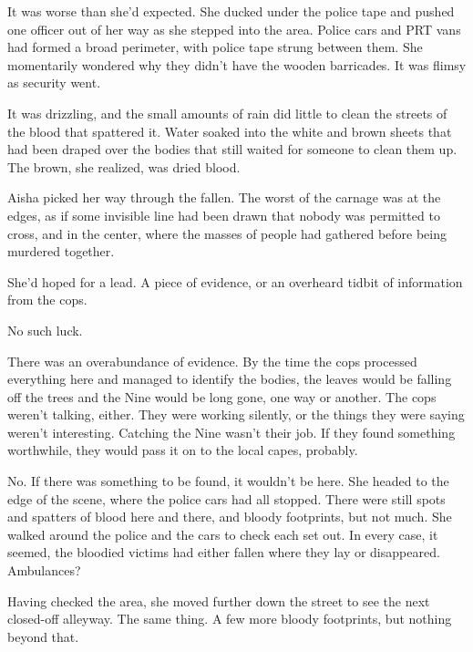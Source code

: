 \sectionbreak



It was worse than she'd expected.  She ducked under the police tape and pushed one officer out of her way as she stepped into the area.  Police cars and PRT vans had formed a broad perimeter, with police tape strung between them.  She momentarily wondered why they didn't have the wooden barricades.  It was flimsy as security went.



It was drizzling, and the small amounts of rain did little to clean the streets of the blood that spattered it.  Water soaked into the white and brown sheets that had been draped over the bodies that still waited for someone to clean them up.  The brown, she realized, was dried blood.



Aisha picked her way through the fallen.  The worst of the carnage was at the edges, as if some invisible line had been drawn that nobody was permitted to cross, and in the center, where the masses of people had gathered before being murdered together.



She'd hoped for a lead.  A piece of evidence, or an overheard tidbit of information from the cops.



No such luck.



There was an overabundance of evidence.  By the time the cops processed everything here and managed to identify the bodies, the leaves would be falling off the trees and the Nine would be long gone, one way or another.  The cops weren't talking, either.  They were working silently, or the things they were saying weren't interesting.  Catching the Nine wasn't their job.  If they found something worthwhile, they would pass it on to the local capes, probably.



No.  If there was something to be found, it wouldn't be here.  She headed to the edge of the scene, where the police cars had all stopped.  There were still spots and spatters of blood here and there, and bloody footprints, but not much.  She walked around the police and the cars to check each set out.  In every case, it seemed, the bloodied victims had either fallen where they lay or disappeared.  Ambulances?



Having checked the area, she moved further down the street to see the next closed-off alleyway.  The same thing.  A few more bloody footprints, but nothing beyond that.



